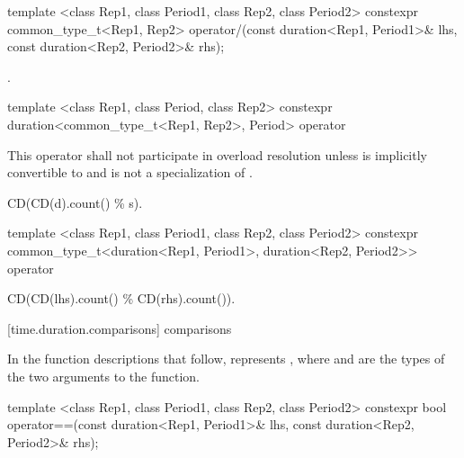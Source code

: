 %
%
\begin{itemdecl}
template <class Rep1, class Period1, class Rep2, class Period2>
  constexpr common_type_t<Rep1, Rep2>
  operator/(const duration<Rep1, Period1>& lhs, const duration<Rep2, Period2>& rhs);
\end{itemdecl}

\begin{itemdescr}
\pnum
\returns {}.
\end{itemdescr}

%
%
\begin{itemdecl}
template <class Rep1, class Period, class Rep2>
  constexpr duration<common_type_t<Rep1, Rep2>, Period>
  operator%
\end{itemdecl}

\begin{itemdescr}
\pnum
\remarks This operator shall not participate in overload
resolution unless  is implicitly convertible to  and
 is not a specialization of .

\pnum
\returns CD(CD(d).count() \% s).
\end{itemdescr}

%
%
\begin{itemdecl}
template <class Rep1, class Period1, class Rep2, class Period2>
  constexpr common_type_t<duration<Rep1, Period1>, duration<Rep2, Period2>>
  operator%
\end{itemdecl}

\begin{itemdescr}
\pnum
\returns CD(CD(lhs).count() \% CD(rhs).count()).
\end{itemdescr}


[time.duration.comparisons]{ comparisons}

\pnum
In the function descriptions that follow,  represents
, where  and  are the types of
the two arguments to the function.

%
%
\begin{itemdecl}
template <class Rep1, class Period1, class Rep2, class Period2>
  constexpr bool operator==(const duration<Rep1, Period1>& lhs, const duration<Rep2, Period2>& rhs);
\end{itemdecl}

